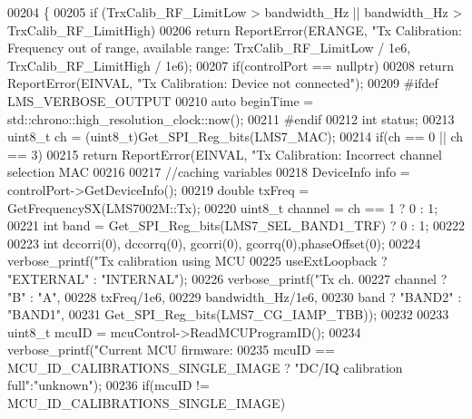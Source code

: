 \begin{DoxyCode}
00204 \{
00205     \textcolor{keywordflow}{if} (TrxCalib_RF_LimitLow > bandwidth\_Hz || bandwidth\_Hz > 
      TrxCalib_RF_LimitHigh)
00206         \textcolor{keywordflow}{return} ReportError(ERANGE, \textcolor{stringliteral}{"Tx Calibration: Frequency out of range, available range: %
      TrxCalib_RF_LimitLow / 1e6, TrxCalib_RF_LimitHigh / 1e6);
00207     \textcolor{keywordflow}{if}(controlPort == \textcolor{keyword}{nullptr})
00208         \textcolor{keywordflow}{return} ReportError(EINVAL, \textcolor{stringliteral}{"Tx Calibration: Device not connected"});
00209 \textcolor{preprocessor}{#ifdef LMS\_VERBOSE\_OUTPUT}
00210     \textcolor{keyword}{auto} beginTime = std::chrono::high\_resolution\_clock::now();
00211 \textcolor{preprocessor}{#endif}
00212     \textcolor{keywordtype}{int} status;
00213     uint8\_t ch = (uint8\_t)Get_SPI_Reg_bits(LMS7_MAC);
00214     \textcolor{keywordflow}{if}(ch == 0 || ch == 3)
00215         \textcolor{keywordflow}{return} ReportError(EINVAL, \textcolor{stringliteral}{"Tx Calibration: Incorrect channel selection MAC %
00216 
00217     \textcolor{comment}{//caching variables}
00218     DeviceInfo info = controlPort->GetDeviceInfo();
00219     \textcolor{keywordtype}{double} txFreq = GetFrequencySX(LMS7002M::Tx);
00220     uint8\_t channel = ch == 1 ? 0 : 1;
00221     \textcolor{keywordtype}{int} band = Get_SPI_Reg_bits(LMS7_SEL_BAND1_TRF) ? 0 : 1;
00222 
00223     \textcolor{keywordtype}{int} dccorri(0), dccorrq(0), gcorri(0), gcorrq(0),phaseOffset(0);
00224     verbose_printf(\textcolor{stringliteral}{"Tx calibration using MCU %
00225                     useExtLoopback ? \textcolor{stringliteral}{"EXTERNAL"} : \textcolor{stringliteral}{"INTERNAL"});
00226     verbose_printf(\textcolor{stringliteral}{"Tx ch.%
00227                     channel ? \textcolor{stringliteral}{"B"} : \textcolor{stringliteral}{"A"},
00228                     txFreq/1e6,
00229                     bandwidth\_Hz/1e6,
00230                     band ? \textcolor{stringliteral}{"BAND2"} : \textcolor{stringliteral}{"BAND1"},
00231                     Get_SPI_Reg_bits(LMS7_CG_IAMP_TBB));
00232 
00233     uint8\_t mcuID = mcuControl->ReadMCUProgramID();
00234     verbose_printf(\textcolor{stringliteral}{"Current MCU firmware: %
00235         mcuID == MCU_ID_CALIBRATIONS_SINGLE_IMAGE ? \textcolor{stringliteral}{"DC/IQ calibration full"}:\textcolor{stringliteral}{"unknown"});
00236     \textcolor{keywordflow}{if}(mcuID != MCU_ID_CALIBRATIONS_SINGLE_IMAGE)
}}}}}
\end{DoxyCode}
